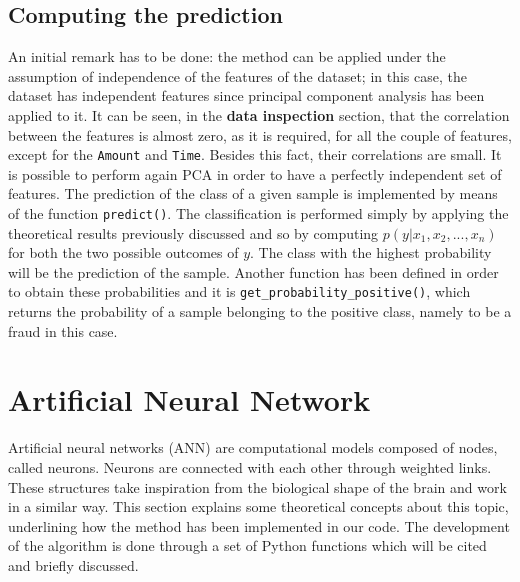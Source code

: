 \documentclass{Configuration_Files/PoliMi3i_thesis}
\begin{document}
\subsection{Computing the prediction}

An initial remark has to be done: the method can be applied under the assumption of independence of the features of the dataset; in this case, the dataset has independent features since principal component analysis has been applied to it. It can be seen, in the \textbf{data inspection} section, that the correlation between the features is almost zero, as it is required, for all the couple of features, except for the \verb|Amount| and \verb|Time|. Besides this fact, their correlations are small.
It is possible to perform again PCA in order to have a perfectly independent set of features.
The prediction of the class of a given sample is implemented by means of the function \verb|predict()|. 
The classification is performed simply by applying the theoretical results previously discussed and so by computing $p(y|x_1, x_2, ..., x_n)$ for both the two possible outcomes of $y$.
The class with the highest probability will be the prediction of the sample.
Another function has been defined in order to obtain these probabilities and it is \verb|get_probability_positive()|, which returns the probability of a sample belonging to the positive class, namely to be a fraud in this case.

\section{Artificial Neural Network}
Artificial neural networks (ANN) are computational models composed of nodes, called neurons. Neurons are connected with each other through weighted links. These structures take inspiration from the biological shape of the brain and work in a similar way.
This section explains some theoretical concepts about this topic, underlining how the method has been implemented in our code.
The development of the algorithm is done through a set of Python functions which will be cited and briefly discussed.
\end{document}
